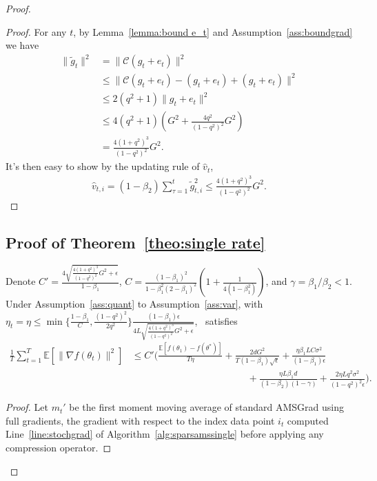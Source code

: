 \documentclass[11pt]{article}
\begin{document}
\begin{proof}
\begin{proof}
For any $t$, by Lemma~\ref{lemma:bound e_t} and Assumption~\ref{ass:boundgrad} we have
\begin{align*}
    \|\tilde g_t\|^2&=\|\mathcal C(g_t+e_t)\|^2\\
    &\leq \|\mathcal C(g_t+e_t)-(g_t+e_t)+(g_t+e_t)\|^2\\
    &\leq 2(q^2+1)\|g_t+e_t\|^2\\
    &\leq 4(q^2+1)(G^2+\frac{4q^2}{(1-q^2)^2}G^2)\\
    &=\frac{4(1+q^2)^3}{(1-q^2)^2}G^2.
\end{align*}
It's then easy to show by the updating rule of $\hat v_t$,
\begin{align*}
    \hat v_{t,i}=(1-\beta_2)\sum_{\tau=1}^t \tilde g_{t,i}^2\leq \frac{4(1+q^2)^3}{(1-q^2)^2}G^2.
\end{align*}

\end{proof}


\subsection{Proof of Theorem~\ref{theo:single rate}}


\begin{Theorem}  \label{theo:single rate}
Denote $C'=\frac{4\sqrt{\frac{4(1+q^2)^3}{(1-q^2)^2}G^2+\epsilon}}{1-\beta_1}$, $C=\frac{(1-\beta_1)^2}{1-\beta_1^2(2-\beta_1)^2}(1+\frac{1}{4(1-\beta_1^2)})$, and $\gamma=\beta_1/\beta_2<1$. Under Assumption~\ref{ass:quant} to Assumption~\ref{ass:var}, with $\eta_t=\eta\leq \min\{\frac{1-\beta_1}{C},\frac{(1-q^2)^2}{2q^2}\}\frac{(1-\beta_1)\epsilon}{4L\sqrt{\frac{4(1+q^2)^3}{(1-q^2)^2}G^2+\epsilon}}$, \algo\ satisfies
\begin{align*}
    \frac{1}{T}\sum_{t=1}^T \mathbb E[\|\nabla f(\theta_t)\|^2]&\leq C'\Big(\frac{\mathbb E[f(\theta_1)-f(\theta^*)]}{T\eta}+\frac{2dG^2}{T(1-\beta_1)\sqrt\epsilon}+\frac{\eta \beta_1 LC\sigma^2}{(1-\beta_1)\epsilon}\\
    &\hspace{2in} +\frac{\eta L\beta_1 d}{(1-\beta_2)(1-\gamma)}+\frac{2\eta L q^2\sigma^2}{(1-q^2)^2\epsilon}\Big).
\end{align*}

\end{Theorem}

\begin{proof}
Let $m_t'$ be the first moment moving average of standard AMSGrad using full gradients, \ie the gradient with respect to the index data point $i_t$ computed Line~\ref{line:stochgrad} of Algorithm~\ref{alg:sparsamssingle} before applying any compression operator.


\end{proof}
\end{proof}
\end{document}
